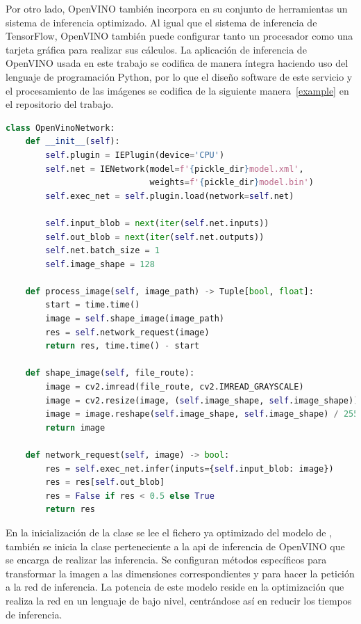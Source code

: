 Por otro lado, OpenVINO también incorpora en su conjunto de herramientas un sistema de inferencia optimizado.
Al igual que el sistema de inferencia de TensorFlow, OpenVINO también puede configurar tanto un procesador como una tarjeta gráfica para realizar sus cálculos.
La aplicación de inferencia de OpenVINO usada en este trabajo se codifica de manera íntegra haciendo uso del lenguaje de programación Python,
por lo que el diseño software de este servicio y el procesamiento de las imágenes se codifica de la siguiente manera~\ref{example} en el repositorio del trabajo.

\begin{lstlisting}[caption=Clase Python para la red de inferencia de OpenVINO.,
    label=a_label,
    language=Python,label={example}]
    class OpenVinoNetwork:
    def __init__(self):
        self.plugin = IEPlugin(device='CPU')
        self.net = IENetwork(model=f'{pickle_dir}model.xml',
                             weights=f'{pickle_dir}model.bin')
        self.exec_net = self.plugin.load(network=self.net)

        self.input_blob = next(iter(self.net.inputs))
        self.out_blob = next(iter(self.net.outputs))
        self.net.batch_size = 1
        self.image_shape = 128

    def process_image(self, image_path) -> Tuple[bool, float]:
        start = time.time()
        image = self.shape_image(image_path)
        res = self.network_request(image)
        return res, time.time() - start

    def shape_image(self, file_route):
        image = cv2.imread(file_route, cv2.IMREAD_GRAYSCALE)
        image = cv2.resize(image, (self.image_shape, self.image_shape))
        image = image.reshape(self.image_shape, self.image_shape) / 255.0
        return image

    def network_request(self, image) -> bool:
        res = self.exec_net.infer(inputs={self.input_blob: image})
        res = res[self.out_blob]
        res = False if res < 0.5 else True
        return res
\end{lstlisting}

En la inicialización de la clase se lee el fichero ya optimizado del modelo de , también se inicia la clase
perteneciente a la api de inferencia de OpenVINO que se encarga de realizar las inferencia.
Se configuran métodos específicos para transformar la imagen a las dimensiones correspondientes y para hacer la petición a la red de inferencia.
La potencia de este modelo reside en la optimización que realiza la red en un lenguaje de bajo nivel, centrándose así en reducir los tiempos de inferencia.

